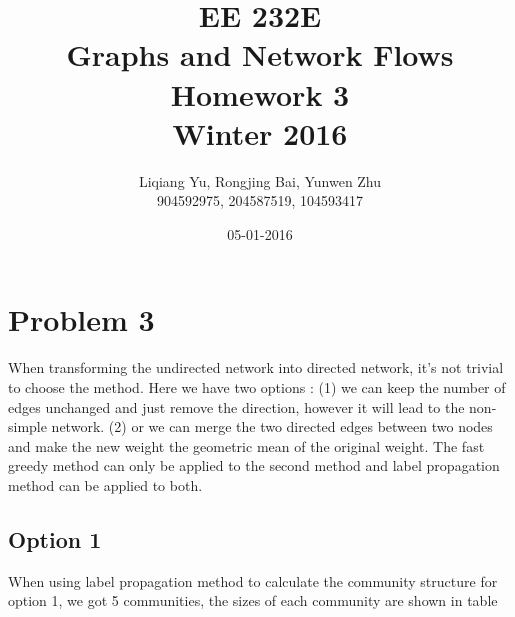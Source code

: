 \documentclass{article}
\begin{document}
\begin{titlepage}
\title{EE 232E \\Graphs and Network Flows\\Homework 3\\Winter 2016} 
\author{Liqiang Yu, Rongjing Bai, Yunwen Zhu\\
904592975, 204587519, 104593417}  %
\date{05-01-2016}
\end{titlepage}

\maketitle
\newpage
\tableofcontents
\newpage

\section{Problem 3}
When transforming the undirected network into directed network, it's not trivial to choose the method. Here we have two options : (1) we can keep the number of edges unchanged and just remove the direction, however it will lead to the  non-simple network. (2) or we can merge the two directed edges between two nodes and make the new weight the geometric mean of the original weight. The fast greedy method can only be applied to the second method and label propagation method can be applied to both.
\subsection{Option 1}
When using label propagation method to calculate the community structure for option 1, we got 5 communities, the sizes of each community are shown in table
\end{document}
